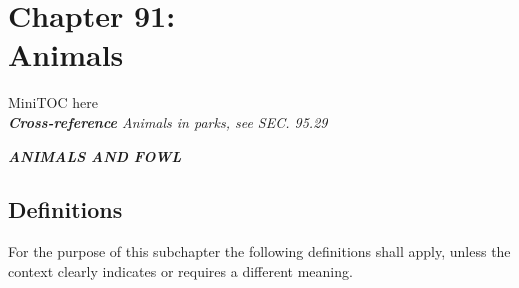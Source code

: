 \documentclass[code.tex]{subfiles}
\begin{document}
\chapter*{Chapter 91: \\
	Animals}

MiniTOC here\\
\emph{\textbf{Cross-reference} Animals in parks, see SEC. 95.29}
\pagebreak


\begin{center}
\emph{\textbf{\LARGE{ANIMALS AND FOWL}}}
\end{center}

\section{Definitions}
For the purpose of this subchapter the following definitions shall apply, unless the context clearly indicates or requires a different meaning.
\end{document}
